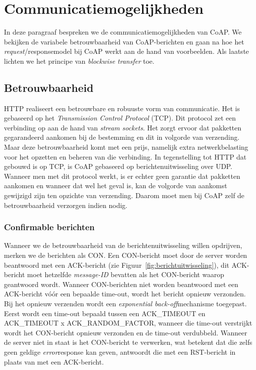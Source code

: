 \newpage

\section{Communicatiemogelijkheden} \label{communicatieMogelijkheden}

In deze paragraaf bespreken we de communicatiemogelijkheden van CoAP. We bekijken de variabele betrouwbaarheid van CoAP-berichten en gaan na hoe het \textit{request}/responsemodel bij CoAP werkt aan de hand van voorbeelden. Als laatste lichten we het principe van \textit{blockwise transfer} toe.

\subsection{Betrouwbaarheid} \label{betrouwbaarheid}

HTTP realiseert een betrouwbare en robuuste vorm van communicatie. Het is gebaseerd op het \textit{Transmission Control Protocol} (TCP). Dit protocol zet een verbinding op aan de hand van \textit{stream sockets}. Het zorgt ervoor dat pakketten gegarandeerd aankomen bij de bestemming en dit in volgorde van verzending. Maar deze betrouwbaarheid komt met een prijs, namelijk extra netwerkbelasting voor het opzetten en beheren van die verbinding. In tegenstelling tot HTTP dat gebouwd is op TCP, is CoAP gebaseerd op berichtenuitwisseling over UDP. Wanneer men met dit protocol werkt, is er echter geen garantie dat pakketten aankomen en wanneer dat wel het geval is, kan de volgorde van aankomst gewijzigd zijn ten opzichte van verzending. Daarom moet men bij CoAP zelf de betrouwbaarheid verzorgen indien nodig.

\subsubsection{Confirmable berichten}

Wanneer we de betrouwbaarheid van de berichtenuitwisseling willen opdrijven, merken we de berichten als CON. Een CON-bericht moet door de server worden beantwoord met een ACK-bericht (zie Figuur~\ref{fig:berichtuitwisseling}), dit ACK-bericht moet hetzelfde \textit{message-ID} bevatten als het CON-bericht waarop geantwoord wordt. Wanneer CON-berichten niet worden beantwoord met een ACK-bericht v\'{o}\'{o}r een bepaalde time-out, wordt het bericht opnieuw verzonden. Bij het opnieuw verzenden wordt een \textit{exponential back-off}mechanisme toegepast. Eerst wordt een time-out bepaald tussen een ACK\_TIMEOUT en ACK\_TIMEOUT x ACK\_RANDOM\_FACTOR, wanneer die time-out verstrijkt wordt het CON-bericht opnieuw verzonden en de time-out verdubbeld. Wanneer de server niet in staat is het CON-bericht te verwerken, wat betekent dat die zelfs geen geldige \textit{error}response kan geven, antwoordt die met een RST-bericht in plaats van met een ACK-bericht.

